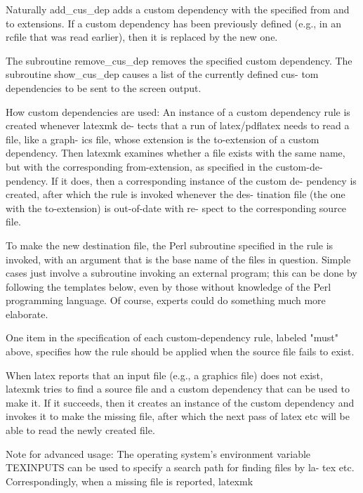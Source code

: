        Naturally  add_cus_dep adds a custom dependency with the specified from
       and to extensions.  If a custom dependency has been previously  defined
       (e.g.,  in an rcfile that was read earlier), then it is replaced by the
       new one.

       The subroutine remove_cus_dep removes the specified custom  dependency.
       The subroutine show_cus_dep causes a list of the currently defined cus-
       tom dependencies to be sent to the screen output.


   How custom dependencies are used:
       An instance of a custom dependency rule is created whenever latexmk de-
       tects  that a run of latex/pdflatex needs to read a file, like a graph-
       ics file, whose extension is the to-extension of a  custom  dependency.
       Then  latexmk  examines  whether  a file exists with the same name, but
       with the corresponding from-extension, as specified in  the  custom-de-
       pendency.   If it does, then a corresponding instance of the custom de-
       pendency is created, after which the rule is invoked whenever the  des-
       tination  file  (the one with the to-extension) is out-of-date with re-
       spect to the corresponding source file.

       To make the new destination file, the Perl subroutine specified in  the
       rule is invoked, with an argument that is the base name of the files in
       question.  Simple cases just involve a subroutine invoking an  external
       program;  this  can  be  done by following the templates below, even by
       those without knowledge of the Perl programming language.   Of  course,
       experts could do something much more elaborate.

       One  item  in the specification of each custom-dependency rule, labeled
       "must" above, specifies how the rule should be applied when the  source
       file fails to exist.

       When  latex reports that an input file (e.g., a graphics file) does not
       exist, latexmk tries to find a source file and a custom dependency that
       can be used to make it.  If it succeeds, then it creates an instance of
       the custom dependency and invokes it to make the  missing  file,  after
       which the next pass of latex etc will be able to read the newly created
       file.

       Note for advanced usage: The operating  system's  environment  variable
       TEXINPUTS can be used to specify a search path for finding files by la-
       tex etc.  Correspondingly, when a missing  file  is  reported,  latexmk




